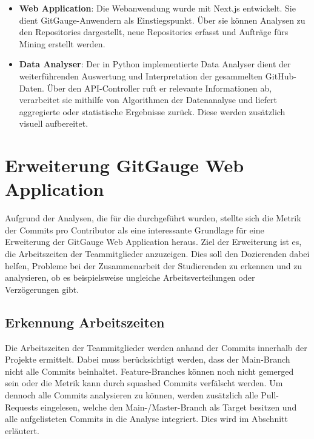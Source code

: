 \begin{itemize}
    \item \textbf{Web Application}: Die Webanwendung wurde mit Next.js entwickelt. Sie dient GitGauge-Anwendern als Einstiegspunkt. Über sie können Analysen zu den Repositories dargestellt, neue Repositories erfasst und Aufträge fürs Mining erstellt werden. 
    \item \textbf{Data Analyser}:  Der in Python implementierte Data Analyser dient der weiterführenden Auswertung und Interpretation der gesammelten GitHub-Daten. Über den API-Controller ruft er relevante Informationen ab, verarbeitet sie mithilfe von Algorithmen der Datenanalyse und liefert aggregierte oder statistische Ergebnisse zurück. Diese werden zusätzlich visuell aufbereitet.
\end{itemize}

\section{Erweiterung GitGauge Web Application}
\label{sec:ErweiterrungGitGaugeWeb}
Aufgrund der Analysen, die für die  durchgeführt wurden, stellte sich die Metrik der Commits pro Contributor als eine interessante Grundlage für eine Erweiterung der GitGauge Web Application heraus.  
Ziel der Erweiterung ist es, die Arbeitszeiten der Teammitglieder anzuzeigen. Dies soll den Dozierenden dabei helfen, Probleme bei der Zusammenarbeit der Studierenden zu erkennen und zu analysieren, ob es beispielsweise ungleiche Arbeitsverteilungen oder Verzögerungen gibt.

\subsection{Erkennung Arbeitszeiten}
Die Arbeitszeiten der Teammitglieder werden anhand der Commits innerhalb der Projekte ermittelt. Dabei muss berücksichtigt werden, dass der Main-Branch nicht alle Commits beinhaltet. Feature-Branches können noch nicht gemerged sein oder die Metrik kann durch squashed Commits verfälscht werden. Um dennoch alle Commits analysieren zu können, werden zusätzlich alle Pull-Requests eingelesen, welche den Main-/Master-Branch als Target besitzen und alle aufgelisteten Commits in die Analyse integriert. Dies wird im Abschnitt  erläutert.

